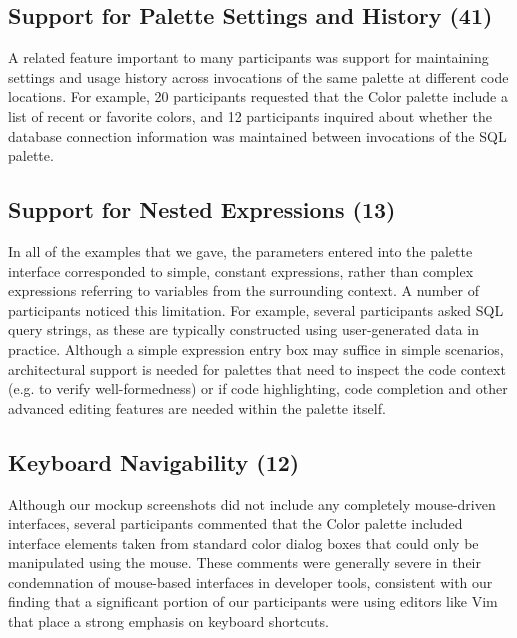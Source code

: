 \documentclass[10pt, conference, compsocconf]{IEEEtran}
\begin{document}
\subsection{Support for Palette Settings and History (41)}

A related feature important to many participants was support for maintaining settings and usage history across invocations of the same palette at different code locations. For example, 20 participants requested that the Color palette include a list of recent or favorite colors, and 12 participants inquired about whether the database connection information was maintained between invocations of the SQL palette. 



\subsection{Support for Nested Expressions (13)}

In all of the examples that we gave, the parameters entered into the palette interface corresponded to simple, constant expressions, rather than complex expressions referring to variables from the surrounding context. A number of participants noticed this limitation. For example, several participants asked SQL query strings, as these are typically constructed using user-generated data in practice. Although a simple expression entry box may suffice in simple scenarios, architectural support is needed for palettes that need to inspect the code context (e.g. to verify well-formedness) or if code highlighting, code completion and other advanced editing features are needed within the palette itself.

\subsection{Keyboard Navigability (12)}

Although our mockup screenshots did not include any completely mouse-driven interfaces, several participants commented that the Color palette included interface elements taken from standard color dialog boxes that could only be manipulated using the mouse. These comments were generally severe in their condemnation of mouse-based interfaces in developer tools, consistent with our finding that a significant portion of our participants were using editors like Vim that place a strong emphasis on keyboard shortcuts.
\end{document}
